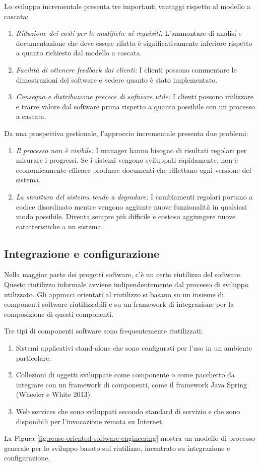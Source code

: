 Lo sviluppo incrementale presenta tre importanti vantaggi rispetto al modello a cascata:
\begin{enumerate}
    \item \textit{Riduzione dei costi per le modifiche ai requisiti:} L'ammontare di analisi e documentazione che deve essere rifatta è significativamente inferiore rispetto a quanto richiesto dal modello a cascata.
    \item \textit{Facilità di ottenere feedback dai clienti:} I clienti possono commentare le dimostrazioni del software e vedere quanto è stato implementato.
    \item \textit{Consegna e distribuzione precoce di software utile:} I clienti possono utilizzare e trarre valore dal software prima rispetto a quanto possibile con un processo a cascata.
\end{enumerate}
Da una prospettiva gestionale, l'approccio incrementale presenta due problemi:
\begin{enumerate}
    \item \textit{Il processo non è visibile:} I manager hanno bisogno di risultati regolari per misurare i progressi. Se i sistemi vengono sviluppati rapidamente, non è economicamente efficace produrre documenti che riflettano ogni versione del sistema.
    \item \textit{La struttura del sistema tende a degradare:} I cambiamenti regolari portano a codice disordinato mentre vengono aggiunte nuove funzionalità in qualsiasi modo possibile. Diventa sempre più difficile e costoso aggiungere nuove caratteristiche a un sistema.
\end{enumerate}

\subsection{Integrazione e configurazione}
Nella maggior parte dei progetti software, c'è un certo riutilizzo del software. Questo riutilizzo informale avviene indipendentemente dal processo di sviluppo utilizzato. Gli approcci orientati al riutilizzo si basano su un insieme di componenti software riutilizzabili e su un framework di integrazione per la composizione di questi componenti.

Tre tipi di componenti software sono frequentemente riutilizzati:
\begin{enumerate}
    \item Sistemi applicativi stand-alone che sono configurati per l'uso in un ambiente particolare.
    \item Collezioni di oggetti sviluppate come componente o come pacchetto da integrare con un framework di componenti, come il framework Java Spring (Wheeler e White 2013).
    \item Web services che sono sviluppati secondo standard di servizio e che sono disponibili per l'invocazione remota su Internet.
\end{enumerate}
La Figura \ref{fig:reuse-oriented-software-engineering} mostra un modello di processo generale per lo sviluppo basato sul riutilizzo, incentrato su integrazione e configurazione. 

